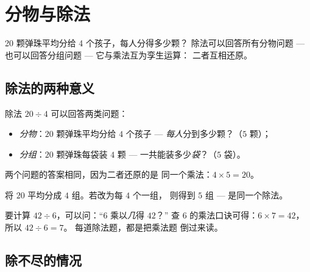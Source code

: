 \chapter{分物与除法}\label{ch:g3:division}

20 颗弹珠平均分给 4 个孩子，每人分得多少颗？
除法可以回答所有分物问题 --- 也可以回答分组问题 ---
它与乘法互为孪生运算：
二者互相还原。

\section{除法的两种意义}

\begin{definition}[除法]\label{def:g3:division:def}
除法 $20 \div 4$ 可以回答两类问题：
\begin{itemize}
  \item \emph{分物}：$20$ 颗弹珠平均分给 $4$ 个孩子 ---
        \emph{每人}分到多少颗？（$5$ 颗）；
  \item \emph{分组}：$20$ 颗弹珠每袋装 $4$ 颗 ---
        一共能装多少\emph{袋}？（$5$ 袋）。
\end{itemize}
两个问题的答案相同，因为二者还原的是
同一个乘法：$4 \times 5 = 20$。
\end{definition}

\begin{omfigure}

{\small 将 $20$ 平均分成 $4$ 组。若改为每 $4$ 个一组，
则得到 $5$ 组 --- 是同一个除法。}
\end{omfigure}

\begin{method}[用乘法口诀做除法]\label{met:g3:division:tables}
要计算 $42 \div 6$，可以问：“$6$ 乘以\emph{几}得 $42$？”
查 $6$ 的乘法口诀可得：$6 \times 7 = 42$，所以 $42 \div 6 = 7$。
每道除法题，都是把乘法题
倒过来读。
\end{method}

\section{除不尽的情况}

